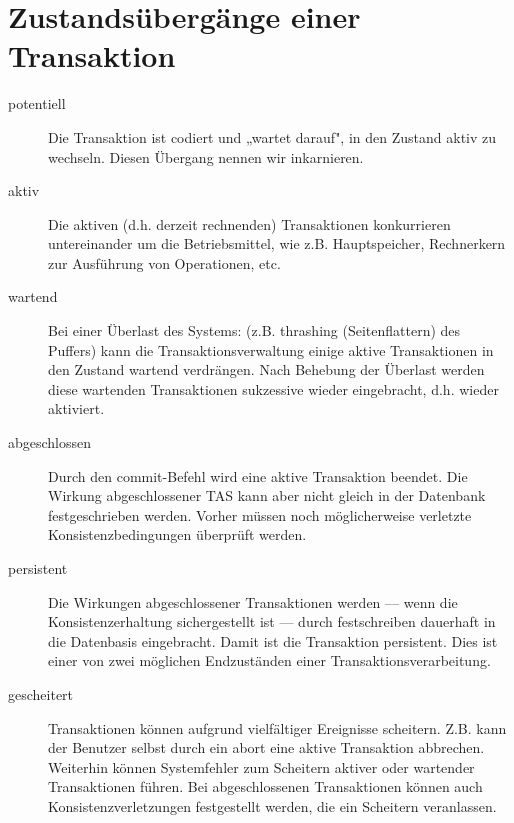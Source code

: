\documentclass{lehramt-informatik-haupt}
\begin{document}
\section{Zustandsübergänge einer Transaktion}

\begin{liQuellen}
\item \cite[Kapitel 9.7, Seite 301]{kemper}
\item \cite[Seite 5]{db:fs:5}
\end{liQuellen}

\begin{description}
\item[potentiell]

Die Transaktion ist codiert und „wartet darauf", in den Zustand aktiv zu
wechseln. Diesen Übergang nennen wir inkarnieren.

\item[aktiv]

Die aktiven (d.h. derzeit rechnenden) Transaktionen konkurrieren
untereinander um die Betriebsmittel, wie z.B. Hauptspeicher, Rechnerkern
zur Ausführung von Operationen, etc.

\item[wartend]

Bei einer Überlast des Systems: (z.B. thrashing (Seitenflattern) des
Puffers) kann die Transaktionsverwaltung einige aktive Transaktionen in
den Zustand wartend verdrängen. Nach Behebung der Überlast werden diese
wartenden Transaktionen sukzessive wieder eingebracht, d.h. wieder
aktiviert.

\item[abgeschlossen]

Durch den commit-Befehl wird eine aktive Transaktion beendet. Die
Wirkung abgeschlossener TAS kann aber nicht gleich in der Datenbank
festgeschrieben werden. Vorher müssen noch möglicherweise verletzte
Konsistenzbedingungen überprüft werden.

\item[persistent]

Die Wirkungen abgeschlossener Transaktionen werden — wenn die
Konsistenzerhaltung sichergestellt ist — durch festschreiben dauerhaft
in die Datenbasis eingebracht. Damit ist die Transaktion persistent.
Dies ist einer von zwei möglichen Endzuständen einer
Transaktionsverarbeitung.

\item[gescheitert]

Transaktionen können aufgrund vielfältiger Ereignisse scheitern. Z.B.
kann der Benutzer selbst durch ein abort eine aktive Transaktion
abbrechen. Weiterhin können Systemfehler zum Scheitern aktiver oder
wartender Transaktionen führen. Bei abgeschlossenen Transaktionen können
auch Konsistenzverletzungen festgestellt werden, die ein Scheitern
veranlassen.


\end{description}
\end{document}
